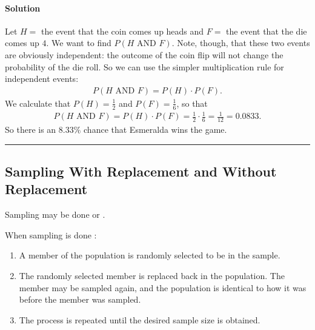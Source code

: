 \documentclass[letterpaper,10pt,english]{jupyterBook}
\begin{document}
\paragraph{Solution}
\label{\detokenize{Ch3 Probability/3.3 Multiplication Rules and Independent Events:id5}}
\sphinxAtStartPar
Let \(H =\) the event that the coin comes up heads and \(F =\) the event that the die comes up \(4\). We want to find \(P(H\text{ AND }F)\). Note, though, that these two events are obviously independent: the outcome of the coin flip will not change the probability of the die roll. So we can use the simpler multiplication rule for independent events:
\begin{equation*}
\begin{split} P(H\text{ AND }F) = P(H) \cdot P(F). \end{split}
\end{equation*}
\sphinxAtStartPar
We calculate that \(P(H) = \frac{1}{2}\) and \(P(F) = \frac{1}{6}\), so that
\begin{equation*}
\begin{split} P(H\text{ AND }F) = P(H) \cdot P(F) = \frac{1}{2} \cdot \frac{1}{6} = \frac{1}{12} = 0.0833. \end{split}
\end{equation*}
\sphinxAtStartPar
So there is an \(8.33\%\) chance that Esmeralda wins the game.


\bigskip\hrule\bigskip



\subsection{Sampling With Replacement and Without Replacement}
\label{\detokenize{Ch3 Probability/3.3 Multiplication Rules and Independent Events:sampling-with-replacement-and-without-replacement}}
\sphinxAtStartPar
Sampling may be done  or .

\sphinxAtStartPar
When sampling is done :
\begin{enumerate}
%
\item {} 
\sphinxAtStartPar
A member of the population is randomly selected to be in the sample.

\item {} 
\sphinxAtStartPar
The randomly selected member is replaced back in the population. The member may be sampled again, and the population is identical to how it was before the member was sampled.

\item {} 
\sphinxAtStartPar
The process is repeated until the desired sample size is obtained.

\end{enumerate}
\end{document}
